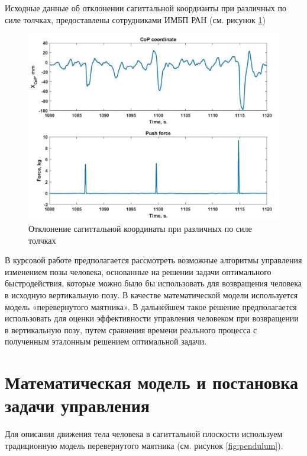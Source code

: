 \documentclass[a4paper,14pt]{article}
\theoremstyle{plain} %
\theoremstyle{definition} %
\theoremstyle{remark} %
\begin{document}
{Исходные данные об отклонении сагиттальной коордианты при различных по силе толчках, предоставлены сотрудниками ИМБП РАН (см. рисунок \ref{fig:pushes})
\begin{figure}[h!]
    \centering
    \includegraphics[width=0.9\linewidth]{Pushes.png}
    \caption{Отклонение сагиттальной координаты при различных по силе толчках}
    \label{fig:pushes}
\end{figure}

В курсовой работе предполагается рассмотреть возможные
алгоритмы управления изменением позы человека, основанные на решении задачи
оптимального быстродействия, которые можно было бы использовать для
возвращения человека в исходную вертикальную позу. В качестве математической модели
используется модель «перевернутого маятника»\cite{PAKrychinin,kasatkin,gurfincel}. В дальнейшем
такое решение предполагается использовать для оценки эффективности управления человеком
при возвращении в вертикальную позу, путем сравнения
времени реального процесса с полученным эталонным решением оптимальной задачи.

\newpage
\section{Математическая модель и постановка задачи управления}
Для описания движения тела человека в сагиттальной плоскости используем традиционную модель перевернутого маятника (см. рисунок \ref{fig:pendulum}).

}
\end{document}

